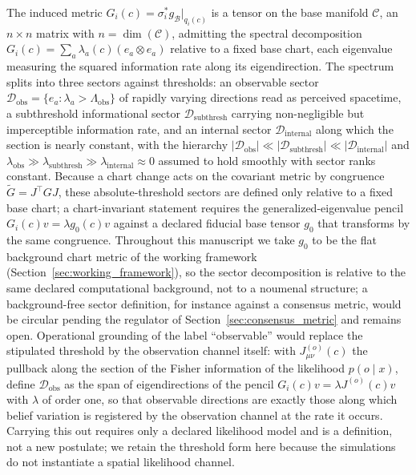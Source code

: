 \documentclass[11pt]{article}
\begin{document}
The induced metric $G_i(c) = \sigma_i^* g_{\mathcal{B}}|_{q_i(c)}$ is a tensor on the base manifold $\mathcal{C}$, an $n \times n$ matrix with $n = \dim(\mathcal{C})$, admitting the spectral decomposition $G_i(c) = \sum_a \lambda_a(c) (e_a \otimes e_a)$ relative to a fixed base chart, each eigenvalue measuring the squared information rate along its eigendirection. The spectrum splits into three sectors against thresholds: an observable sector $\mathcal{D}_{\text{obs}} = \{e_a : \lambda_a > \Lambda_{\text{obs}}\}$ of rapidly varying directions read as perceived spacetime, a subthreshold informational sector $\mathcal{D}_{\text{subthresh}}$ carrying non-negligible but imperceptible information rate, and an internal sector $\mathcal{D}_{\text{internal}}$ along which the section is nearly constant, with the hierarchy $|\mathcal{D}_{\text{obs}}| \ll |\mathcal{D}_{\text{subthresh}}| \ll |\mathcal{D}_{\text{internal}}|$ and $\lambda_{\text{obs}} \gg \lambda_{\text{subthresh}} \gg \lambda_{\text{internal}} \approx 0$ assumed to hold smoothly with sector ranks constant. Because a chart change acts on the covariant metric by congruence $\tilde{G} = J^\top G J$, these absolute-threshold sectors are defined only relative to a fixed base chart; a chart-invariant statement requires the generalized-eigenvalue pencil $G_i(c) v = \lambda g_0(c) v$ against a declared fiducial base tensor $g_0$ that transforms by the same congruence. Throughout this manuscript we take $g_0$ to be the flat background chart metric of the working framework (Section~\ref{sec:working_framework}), so the sector decomposition is relative to the same declared computational background, not to a noumenal structure; a background-free sector definition, for instance against a consensus metric, would be circular pending the regulator of Section~\ref{sec:consensus_metric} and remains open. Operational grounding of the label ``observable'' would replace the stipulated threshold by the observation channel itself: with $J^{(o)}_{\mu\nu}(c)$ the pullback along the section of the Fisher information of the likelihood $p(o \mid x)$, define $\mathcal{D}_{\text{obs}}$ as the span of eigendirections of the pencil $G_i(c) v = \lambda J^{(o)}(c) v$ with $\lambda$ of order one, so that observable directions are exactly those along which belief variation is registered by the observation channel at the rate it occurs. Carrying this out requires only a declared likelihood model and is a definition, not a new postulate; we retain the threshold form here because the simulations do not instantiate a spatial likelihood channel.
\end{document}
